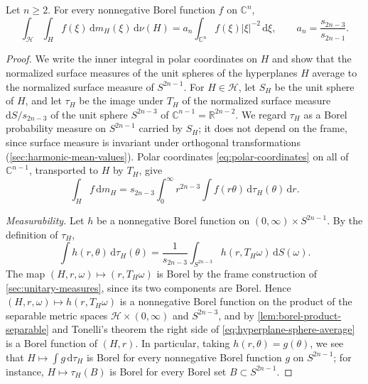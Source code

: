 \begin{lemma}\label{lem:complex-hyperplane-average}
Let $n\geq2$. For every nonnegative Borel function $f$ on $\mathbb C^n$,
\[
 \int_{\mathcal H}\int_H f(\xi)\,\mathrm d m_H(\xi)\,\mathrm d\nu(H)
 =a_n\int_{\mathbb C^n}f(\xi)|\xi|^{-2}\,\mathrm d\xi,
 \qquad a_n=\frac{s_{2n-3}}{s_{2n-1}}.
\]
\end{lemma}
\begin{proof}
We write the inner integral in polar coordinates on $H$ and show that the normalized surface measures of the unit spheres of the hyperplanes $H$ average to the normalized surface measure of $S^{2n-1}$. For $H\in\mathcal H$, let $S_H$ be the unit sphere of $H$, and let $\tau_H$ be the image under $T_H$ of the normalized surface measure $\mathrm dS/s_{2n-3}$ of the unit sphere $S^{2n-3}$ of $\mathbb C^{n-1}=\mathbb R^{2n-2}$. We regard $\tau_H$ as a Borel probability measure on $S^{2n-1}$ carried by $S_H$; it does not depend on the frame, since surface measure is invariant under orthogonal transformations (\cref{sec:harmonic-mean-values}). Polar coordinates \eqref{eq:polar-coordinates} on all of $\mathbb C^{n-1}$, transported to $H$ by $T_H$, give
\[
 \int_Hf\,\mathrm d m_H=s_{2n-3}\int_0^\infty r^{2n-3}\int f(r\theta)\,\mathrm d\tau_H(\theta)\,\mathrm d r.
\]

\emph{Measurability.} Let $h$ be a nonnegative Borel function on $(0,\infty)\times S^{2n-1}$. By the definition of $\tau_H$,
\begin{equation}\label{eq:hyperplane-sphere-average}
 \int h(r,\theta)\,\mathrm d\tau_H(\theta)=\frac1{s_{2n-3}}\int_{S^{2n-3}}h(r,T_H\omega)\,\mathrm dS(\omega).
\end{equation}
The map $(H,r,\omega)\mapsto(r,T_H\omega)$ is Borel by the frame construction of \cref{sec:unitary-measures}, since its two components are Borel. Hence $(H,r,\omega)\mapsto h(r,T_H\omega)$ is a nonnegative Borel function on the product of the separable metric spaces $\mathcal H\times(0,\infty)$ and $S^{2n-3}$, and by \cref{lem:borel-product-separable} and Tonelli's theorem the right side of \eqref{eq:hyperplane-sphere-average} is a Borel function of $(H,r)$. In particular, taking $h(r,\theta)=g(\theta)$, we see that $H\mapsto\int g\,\mathrm d\tau_H$ is Borel for every nonnegative Borel function $g$ on $S^{2n-1}$; for instance, $H\mapsto\tau_H(B)$ is Borel for every Borel set $B\subset S^{2n-1}$.


\end{proof}
